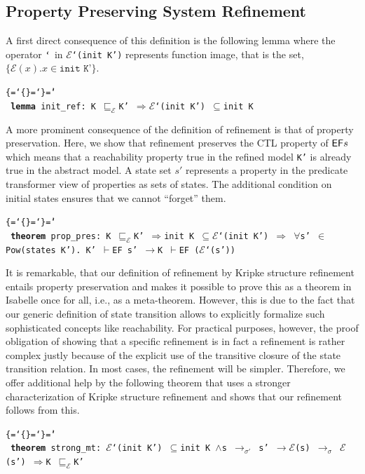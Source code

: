 \documentclass{llncs}
\newenvironment{ttbox}{\begin{alltt}\ttbraces\small\tt}%
                      {\end{alltt}}
\def\ttbraces{\let\.=\nobreak\chardef\{=`\{\chardef\}=`\}\chardef\|=`\\}
\newcommand\ttand{\mbox{{$\land$}}}
\newcommand\ttimp{\mbox{{$\longrightarrow$}}}
\newcommand\ttforall{\mbox{{$\forall$}}}
\newcommand\ttin{\mbox{{$\in$}}}
\newcommand\ttImp{\mbox{{$\Longrightarrow$}}}
\newcommand\ttrel[1]{\mbox{{$\to_{#1}$}}}
\newcommand\ttsubseteq{\mbox{{$\subseteq$}}}
\newcommand\ttvdash{\mbox{{$\vdash$}}}
\newcommand\ttmref[1]{\mbox{{$\sqsubseteq_{#1}$}}}
\newcommand\ttmeref{\ttmref{\mathcal{E}}}
\newcommand\ttecal{\mbox{$\mathcal{E}$}}
\newcommand\ttimg{\mbox{\texttt{`}}}
\begin{document}
\subsection{Property Preserving System Refinement}
A first direct consequence of this definition is the following lemma
where the operator \texttt{$\ttimg$} in \texttt{\ttecal\ttimg(init K')}
represents function image, that is the set, $\{\ttecal(x). x \in \texttt{init K'}\} $.
\begin{ttbox}
{\bf{lemma}} init_ref: K \ttmeref K' \ttImp \ttecal\ttimg(init K') \ttsubseteq init K
\end{ttbox}
A more prominent consequence of the definition of refinement 
is that of property preservation. Here, we show that refinement preserves the
CTL property of ${\sf EF} s$ which means that a reachability property true in the
refined  model \texttt{K'} %
is already true in the abstract model.
A state set $s'$ represents a property %
in the predicate transformer view of properties as sets of states. 
The additional condition on initial states ensures that we cannot ``forget'' them. 
\begin{ttbox}
{\bf{theorem}} prop_pres: 
   K \ttmeref K'  \ttImp init K \ttsubseteq \ttecal\ttimg(init K') \ttImp
   \ttforall s' \ttin Pow(states K'). K' \ttvdash {\sf EF} s' \ttimp K \ttvdash {\sf EF} (\ttecal\ttimg(s'))
\end{ttbox}
It is remarkable, that our definition of refinement by Kripke 
structure refinement entails property preservation and makes it possible 
to prove this as a theorem in Isabelle once for all, i.e., as a meta-theorem.
However, this is due to the fact that our generic definition of state transition
allows to explicitly formalize such sophisticated concepts like reachability.
For practical purposes, however, the proof obligation of showing that
a specific refinement is in fact a refinement is rather complex
justly because of the explicit use of the transitive closure of the state
transition relation.
In most cases, the refinement will be simpler. Therefore, we offer
additional help by the following theorem that uses a stronger characterization
of Kripke structure refinement and shows that our refinement follows
from this.
\begin{ttbox}
{\bf{theorem}} strong_mt: 
\ttecal\ttimg(init K') \ttsubseteq init K \ttand s \ttrel{\sigma'} s' \ttimp \ttecal(s) \ttrel{\sigma} \ttecal(s') 
\ttImp K \ttmeref K'
\end{ttbox}
\end{document}
